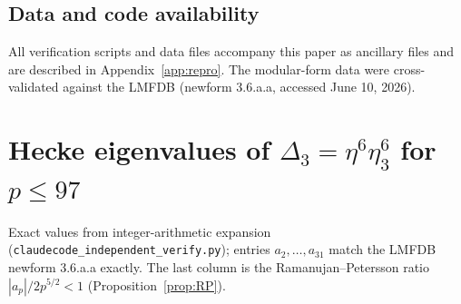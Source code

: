 \documentclass[11pt,reqno]{amsart}
\theoremstyle{plain}
\theoremstyle{definition}
\theoremstyle{remark}
\newcommand{\Dthree}{\Delta_{3}}
\begin{document}
\subsection*{Data and code availability}
All verification scripts and data files accompany this paper as
ancillary files and are described in Appendix~\ref{app:repro}.  The
modular-form data were cross-validated against the LMFDB
\cite{LMFDB} (newform \textsf{3.6.a.a}, accessed June 10, 2026).


\appendix

\section{Hecke eigenvalues of
\texorpdfstring{$\Dthree=\eta^6\eta_3^6$}{Delta3} for
\texorpdfstring{$p\le97$}{p<=97}}\label{app:hecke}

Exact values from integer-arithmetic expansion
(\texttt{claudecode\_independent\_verify.py}); entries
$a_2,\dots,a_{31}$ match the LMFDB newform \textsf{3.6.a.a}
\cite{LMFDB} exactly.  The last column is the Ramanujan--Petersson
ratio $|a_p|/2p^{5/2}<1$ (Proposition~\ref{prop:RP}).
\end{document}
